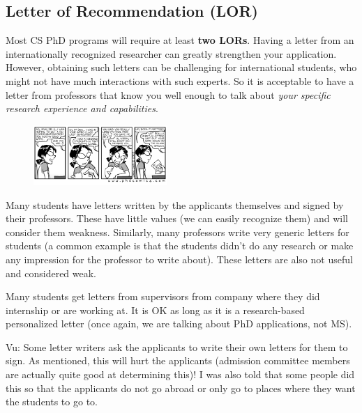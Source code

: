 \documentclass[11pt]{article}
\newenvironment{commentbox}{
 \small
    \begin{cbox}
 }{
   \end{cbox}
}
\begin{document}
\subsection{Letter of Recommendation (LOR)}\label{sec:lor}

Most CS PhD programs will require at least \textbf{two LORs}. Having a letter from an internationally recognized researcher can greatly strengthen your application. However, obtaining such letters
can be challenging for international students, who might not have much interactions with such experts. So it is acceptable to have a letter from professors that know you well enough to talk about \emph{your specific research experience and capabilities}.

\begin{figure}
    \vspace{-0.3in}
      \begin{center}
        \includegraphics[width=0.45\textwidth]{c6.png}
      \end{center}
    \vspace{-0.4in}
    \end{figure}
Many students have letters written by the applicants themselves and signed by their professors. These have little
values (we can easily recognize them) and will consider them weakness.
Similarly, many professors write very generic letters for students (a common example is that the students didn't do any
research or make any impression for the professor to write about). These letters are also not useful and considered weak.

Many students get letters from supervisors from company where they did internship or are
working at. It is OK as long as it is a research-based personalized
letter (once again, we are talking about PhD applications, not MS).

\begin{commentbox}
Vu: Some letter writers ask the applicants to write their own letters for them to sign. As mentioned, this will hurt the applicants (admission committee members are actually quite good at determining this)! I was also told that some people did this so that the applicants do not go abroad or only go to places where they want the students to go to.
\end{commentbox}
\end{document}
